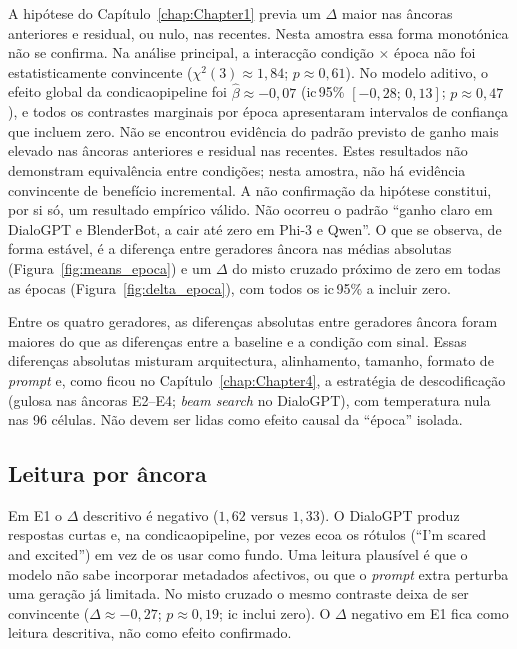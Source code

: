 A hipótese do Capítulo~\ref{chap:Chapter1} previa um \(\Delta\) maior nas âncoras anteriores e residual, ou nulo, nas recentes. Nesta amostra essa forma monotónica não se confirma. Na análise principal, a interacção condição \(\times\) época não foi estatisticamente convincente (\(\chi^2(3) \approx 1{,}84\); \(p \approx 0{,}61\)). No modelo aditivo, o efeito global da \gls{condicaopipeline} foi \(\hat\beta \approx -0{,}07\) (\gls{ic}\,95\% \([-0{,}28;\,0{,}13]\); \(p \approx 0{,}47\)), e todos os contrastes marginais por época apresentaram intervalos de confiança que incluem zero. Não se encontrou evidência do padrão previsto de ganho mais elevado nas âncoras anteriores e residual nas recentes. Estes resultados não demonstram equivalência entre condições; nesta amostra, não há evidência convincente de benefício incremental. A não confirmação da hipótese constitui, por si só, um resultado empírico válido. Não ocorreu o padrão ``ganho claro em DialoGPT e BlenderBot, a cair até zero em Phi-3 e Qwen''. O que se observa, de forma estável, é a diferença entre geradores âncora nas médias absolutas (Figura~\ref{fig:means_epoca}) e um \(\Delta\) do misto cruzado próximo de zero em todas as épocas (Figura~\ref{fig:delta_epoca}), com todos os \gls{ic}\,95\% a incluir zero.

Entre os quatro geradores, as diferenças absolutas entre geradores âncora foram maiores do que as diferenças entre a \gls{baseline} e a condição com sinal. Essas diferenças absolutas misturam arquitectura, alinhamento, tamanho, formato de \textit{prompt} e, como ficou no Capítulo~\ref{chap:Chapter4}, a estratégia de descodificação (gulosa nas âncoras E2--E4; \textit{beam search} no DialoGPT), com temperatura nula nas 96 células. Não devem ser lidas como efeito causal da ``época'' isolada.

\subsection{Leitura por âncora}
\label{subsec:disc_ancoras}

Em E1 o \(\Delta\) descritivo é negativo (\(1{,}62\) versus \(1{,}33\)). O DialoGPT produz respostas curtas e, na \gls{condicaopipeline}, por vezes ecoa os rótulos (``I'm scared and excited'') em vez de os usar como fundo. Uma leitura plausível é que o modelo não sabe incorporar metadados afectivos, ou que o \textit{prompt} extra perturba uma geração já limitada. No misto cruzado o mesmo contraste deixa de ser convincente (\(\Delta \approx -0{,}27\); \(p \approx 0{,}19\); \gls{ic} inclui zero). O \(\Delta\) negativo em E1 fica como leitura descritiva, não como efeito confirmado.

